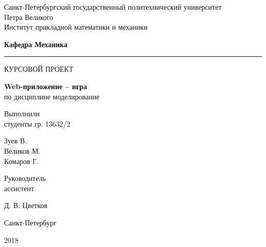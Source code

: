 \documentclass[report.tex]{subfiles}
\begin{document}
\begin{titlepage}

\begin{centering}
\large{
Санкт-Петербургский государственный политехнический университет\\
 Петра Великого\\
Институт прикладной математики и механики\\
}

\textbf{Кафедра  Механика\rk}
\par
\vspace{10 pt}
\hrule
\vfill

\LARGE{КУРСОВОЙ ПРОЕКТ}

\vfill

\Large \textbf {Web-приложение – игра \rk}\\
\Large {по дисциплине  моделирование\rk}
\vfill
\vfill

\normalsize
\begin{flushleft}
Выполнили\\
студенты гр. 13632/2
\end{flushleft}
\begin{flushright}
Зуев В.\\
Великов М.\\
Комаров Г.\\
\end{flushright}
\begin{flushleft}
Руководитель\\
ассистент
\end{flushleft}
\begin{flushright}
Д. В. Цветков\\
\end{flushright}
\vfill
\vfill

Санкт-Петербург
\par
2018

\end{centering}
\end{titlepage}
\end{document}
